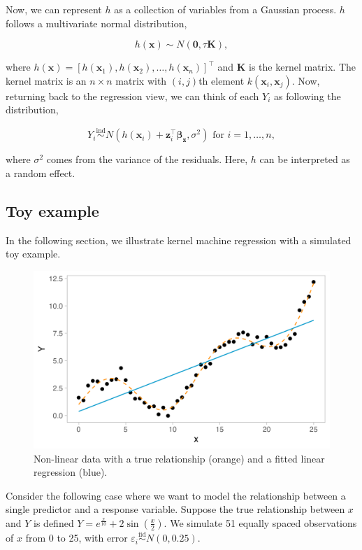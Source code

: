 \documentclass[12pt, twoside]{amherstthesis}
\begin{document}
Now, we can represent \(h\) as a collection of variables from a Gaussian process. \(h\) follows a multivariate normal distribution,

\[
h({\textbf{x}}) \sim N(\textbf{0}, \tau\textbf{K}),
\]

\noindent where \(h({\textbf{x}}) = [h(\textbf{x}_1), h(\textbf{x}_2), \dots, h(\textbf{x}_n)]^\top\) and \(\textbf{K}\) is the kernel matrix. The kernel matrix is an \(n \times n\) matrix with \((i, j)\)th element \(k(\textbf{x}_i, \textbf{x}_j)\). Now, returning back to the regression view, we can think of each \(Y_i\) as following the distribution,

\[
Y_i \overset{\mathrm{ind}}{\sim} N(h(\textbf{x}_i) + \textbf{z}_i^\top \boldsymbol{\beta}_{\textbf{z}}, \sigma^2) \text{ for } i = 1,\dots,n,
\]

\noindent where \(\sigma^2\) comes from the variance of the residuals. Here, \(h\) can be interpreted as a random effect.

\hypertarget{bkmrtoy}{%
\subsection{Toy example}\label{bkmrtoy}}

In the following section, we illustrate kernel machine regression with a simulated toy example.
\begin{figure}

{\centering \includegraphics[width=0.75\linewidth]{figures/ch3_toy1} 

}

\caption{Non-linear data with a true relationship (orange) and a fitted linear regression (blue).}\label{fig:toy1}
\end{figure}
Consider the following case where we want to model the relationship between a single predictor and a response variable. Suppose the true relationship between \(x\) and \(Y\) is defined \(Y = e^{\frac{x}{10}} + 2\sin(\frac{x}{2})\). We simulate 51 equally spaced observations of \(x\) from 0 to 25, with error \(\varepsilon_i \overset{\text{iid}}\sim N(0, 0.25)\).
\end{document}
